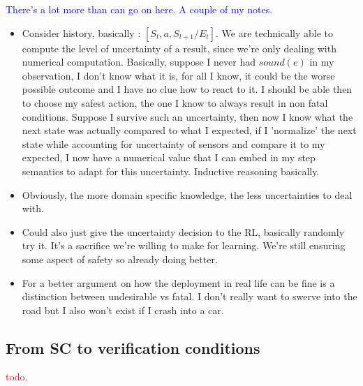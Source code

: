 \documentclass[a4paper,11pt]{article}
\begin{document}
\textcolor{blue}{There's a lot more than can go on here. A couple of my notes.}
\begin{itemize}
  \item Consider history, basically : $[S_t, a, S_{t+1}/E_t]$. We are technically able to compute the level of uncertainty of a result, since
        we're only dealing with numerical computation. Basically, suppose I never had $sound(e)$ in my observation, I don't know what it is, for all I know, 
        it could be the worse possible outcome and I have no clue how to react to it. I should be able then to choose my safest action, the one I know to always result 
        in non fatal conditions. Suppose I survive such an uncertainty, then now I know what the next state was actually compared to what I expected,
        if I 'normalize' the next state while accounting for uncertainty of sensors and compare it to my expected, I now have a numerical value that 
        I can embed in my step semantics to adapt for this uncertainty. Inductive reasoning basically. 
  \item Obviously, the more domain specific knowledge, the less uncertainties to deal with.
  \item Could also just give the uncertainty decision to the RL, basically randomly try it. It's a sacrifice we're willing to make 
        for learning. We're still ensuring some aspect of safety so already doing better.
  \item For a better argument on how the deployment in real life can be fine is a distinction between 
        undesirable vs fatal. I don't really want to swerve into the road but I also won't exist if I crash into a car. 
\end{itemize}

\subsection{From SC to verification conditions} 
\textcolor{red}{todo.}
 
\end{document}
